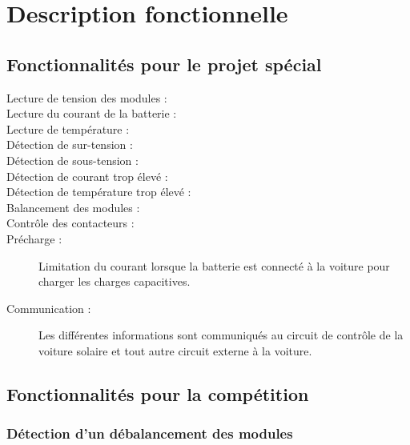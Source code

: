
\section{Description fonctionnelle}

	\subsection{Fonctionnalités pour le projet spécial}
	
		\begin{description}
			\item [Lecture de tension des modules :] 
			
			\item [Lecture du courant de la batterie :]
			
			\item [Lecture de température :]
			
			\item [Détection de sur-tension :]
			
			\item [Détection de sous-tension :]
			
			\item [Détection de courant trop élevé :]
			
			\item [Détection de température trop élevé :]
			
			\item [Balancement des modules :]
			
			\item [Contrôle des contacteurs :]
			
			\item [Précharge :]
			Limitation du courant lorsque la batterie est connecté à la voiture pour charger les charges capacitives.
			\item [Communication :] 
			Les différentes informations sont communiqués au circuit de contrôle de la voiture solaire et tout autre circuit externe à la voiture.	
		\end{description} 
	
	\subsection{Fonctionnalités pour la compétition}
		\subsubsection{Détection d'un débalancement des modules}	
	
